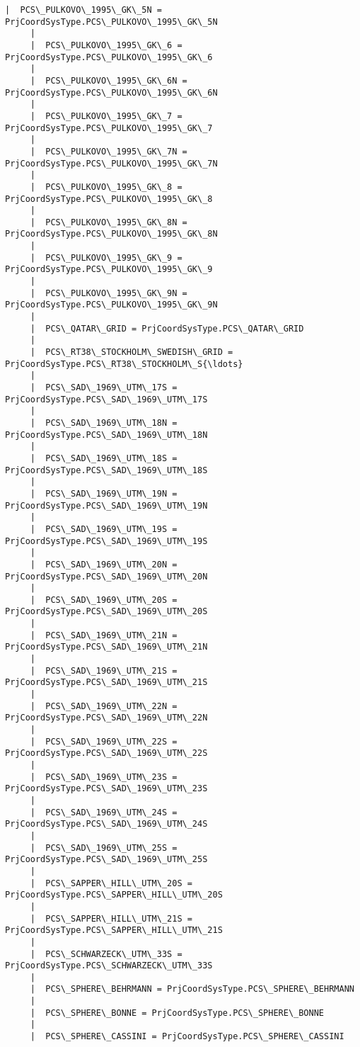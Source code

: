\documentclass[11pt]{article}
\begin{document}
\begin{Verbatim}[commandchars=\\\{\}]
     |  PCS\_PULKOVO\_1995\_GK\_5N = PrjCoordSysType.PCS\_PULKOVO\_1995\_GK\_5N
     |  
     |  PCS\_PULKOVO\_1995\_GK\_6 = PrjCoordSysType.PCS\_PULKOVO\_1995\_GK\_6
     |  
     |  PCS\_PULKOVO\_1995\_GK\_6N = PrjCoordSysType.PCS\_PULKOVO\_1995\_GK\_6N
     |  
     |  PCS\_PULKOVO\_1995\_GK\_7 = PrjCoordSysType.PCS\_PULKOVO\_1995\_GK\_7
     |  
     |  PCS\_PULKOVO\_1995\_GK\_7N = PrjCoordSysType.PCS\_PULKOVO\_1995\_GK\_7N
     |  
     |  PCS\_PULKOVO\_1995\_GK\_8 = PrjCoordSysType.PCS\_PULKOVO\_1995\_GK\_8
     |  
     |  PCS\_PULKOVO\_1995\_GK\_8N = PrjCoordSysType.PCS\_PULKOVO\_1995\_GK\_8N
     |  
     |  PCS\_PULKOVO\_1995\_GK\_9 = PrjCoordSysType.PCS\_PULKOVO\_1995\_GK\_9
     |  
     |  PCS\_PULKOVO\_1995\_GK\_9N = PrjCoordSysType.PCS\_PULKOVO\_1995\_GK\_9N
     |  
     |  PCS\_QATAR\_GRID = PrjCoordSysType.PCS\_QATAR\_GRID
     |  
     |  PCS\_RT38\_STOCKHOLM\_SWEDISH\_GRID = PrjCoordSysType.PCS\_RT38\_STOCKHOLM\_S{\ldots}
     |  
     |  PCS\_SAD\_1969\_UTM\_17S = PrjCoordSysType.PCS\_SAD\_1969\_UTM\_17S
     |  
     |  PCS\_SAD\_1969\_UTM\_18N = PrjCoordSysType.PCS\_SAD\_1969\_UTM\_18N
     |  
     |  PCS\_SAD\_1969\_UTM\_18S = PrjCoordSysType.PCS\_SAD\_1969\_UTM\_18S
     |  
     |  PCS\_SAD\_1969\_UTM\_19N = PrjCoordSysType.PCS\_SAD\_1969\_UTM\_19N
     |  
     |  PCS\_SAD\_1969\_UTM\_19S = PrjCoordSysType.PCS\_SAD\_1969\_UTM\_19S
     |  
     |  PCS\_SAD\_1969\_UTM\_20N = PrjCoordSysType.PCS\_SAD\_1969\_UTM\_20N
     |  
     |  PCS\_SAD\_1969\_UTM\_20S = PrjCoordSysType.PCS\_SAD\_1969\_UTM\_20S
     |  
     |  PCS\_SAD\_1969\_UTM\_21N = PrjCoordSysType.PCS\_SAD\_1969\_UTM\_21N
     |  
     |  PCS\_SAD\_1969\_UTM\_21S = PrjCoordSysType.PCS\_SAD\_1969\_UTM\_21S
     |  
     |  PCS\_SAD\_1969\_UTM\_22N = PrjCoordSysType.PCS\_SAD\_1969\_UTM\_22N
     |  
     |  PCS\_SAD\_1969\_UTM\_22S = PrjCoordSysType.PCS\_SAD\_1969\_UTM\_22S
     |  
     |  PCS\_SAD\_1969\_UTM\_23S = PrjCoordSysType.PCS\_SAD\_1969\_UTM\_23S
     |  
     |  PCS\_SAD\_1969\_UTM\_24S = PrjCoordSysType.PCS\_SAD\_1969\_UTM\_24S
     |  
     |  PCS\_SAD\_1969\_UTM\_25S = PrjCoordSysType.PCS\_SAD\_1969\_UTM\_25S
     |  
     |  PCS\_SAPPER\_HILL\_UTM\_20S = PrjCoordSysType.PCS\_SAPPER\_HILL\_UTM\_20S
     |  
     |  PCS\_SAPPER\_HILL\_UTM\_21S = PrjCoordSysType.PCS\_SAPPER\_HILL\_UTM\_21S
     |  
     |  PCS\_SCHWARZECK\_UTM\_33S = PrjCoordSysType.PCS\_SCHWARZECK\_UTM\_33S
     |  
     |  PCS\_SPHERE\_BEHRMANN = PrjCoordSysType.PCS\_SPHERE\_BEHRMANN
     |  
     |  PCS\_SPHERE\_BONNE = PrjCoordSysType.PCS\_SPHERE\_BONNE
     |  
     |  PCS\_SPHERE\_CASSINI = PrjCoordSysType.PCS\_SPHERE\_CASSINI

\end{Verbatim}
\end{document}
